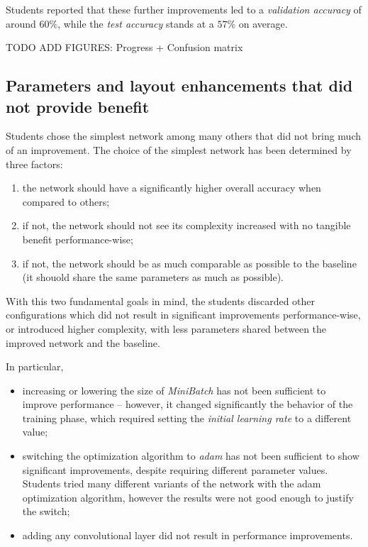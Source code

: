 \documentclass[a4paper, 11pt]{article} %
\begin{document}
Students reported that these further improvements led to a \emph{validation accuracy} of around $60\%$, while the \emph{test accuracy} stands at a $57\%$ on average.

TODO ADD FIGURES: Progress + Confusion matrix

\subsection{Parameters and layout enhancements that did not provide benefit}

Students chose the simplest network among many others that did not bring much of an improvement. The choice of the simplest network has been determined by three factors:

\begin{enumerate}
    \item the network should have a significantly higher overall accuracy when compared to others;
    \item if not, the network should not see its complexity increased with no tangible benefit performance-wise;
    \item if not, the network should be as much comparable as possible to the baseline (it shouold share the same parameters as much as possible).
\end{enumerate}

With this two fundamental goals in mind, the students discarded other configurations which did not result in significant improvements performance-wise, or introduced higher complexity, with less parameters shared between the improved network and the baseline.

In particular,

\begin{itemize}
    \item increasing or lowering the size of \emph{MiniBatch} has not been sufficient to improve performance \--- however, it changed significantly the behavior of the training phase, which required setting the \emph{initial learning rate} to a different value;
    \item switching the optimization algorithm to \emph{adam} has not been sufficient to show significant improvements, despite requiring different parameter values. Students tried many different variants of the network with the adam optimization algorithm, however the results were not good enough to justify the switch;
    \item adding any convolutional layer did not result in performance improvements.
\end{itemize}
\end{document}
